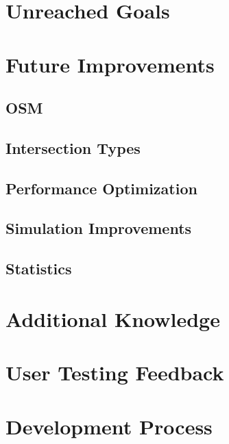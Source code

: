 
\section{Unreached Goals}

\section{Future Improvements}

    \subsection{OSM}

    \subsection{Intersection Types}

    \subsection{Performance Optimization}

    \subsection{Simulation Improvements}

    \subsection{Statistics}

\section{Additional Knowledge}

\section{User Testing Feedback}

\section{Development Process}

